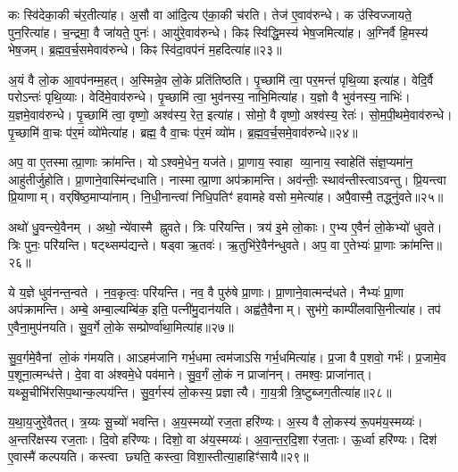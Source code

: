 कः स्वि॑देका॒की च॑र॒तीत्या॑ह।
अ॒सौ वा आ॑दि॒त्य ए॑का॒की च॑रति।
तेज॑ ए॒वाव॑रुन्धे।
क उ॑स्विज्जायते॒ पुन॒रित्या॑ह।
च॒न्द्रमा॒ वै जा॑यते॒ पुनः॑।
आयु॑रे॒वाव॑रुन्धे।
किꣴ स्वि॑द्धि॒मस्य॑ भेष॒जमित्या॑ह।
अ॒ग्निर्वै हि॒मस्य॑ भेष॒जम्।
ब्र॒ह्म॒व॒र्च॒समेवाव॑रुन्धे।
किꣴ स्वि॑दा॒वप॑नं म॒हदित्या॑ह॥२३॥

अ॒यं वै लो॒क आ॒वप॑नम्म॒हत्।
अ॒स्मिन्ने॒व लो॒के प्रति॑तिष्ठति।
पृ॒च्छामि॑ त्वा॒ पर॒मन्तं॑ पृथि॒व्या इत्या॑ह।
वेदि॒र्वै परो\-ऽन्तः॑ पृथि॒व्याः।
वेदि॑मे॒वाव॑रुन्धे।
पृ॒च्छामि॑ त्वा॒ भुव॑नस्य॒ नाभि॒मित्या॑ह।
य॒ज्ञो वै भुव॑नस्य॒ नाभिः॑।
य॒ज्ञमे॒वाव॑रुन्धे।
पृ॒च्छामि॑ त्वा॒ वृष्णो॒ अश्व॑स्य॒ रेत॒ इत्या॑ह।
सोमो॒ वै वृष्णो॒ अश्व॑स्य॒ रेतः॑।
सो॒म॒पी॒थमे॒वाव॑रुन्धे।
पृ॒च्छामि॑ वा॒चः प॑र॒मं व्यो॑मेत्या॑ह।
ब्रह्म॒ वै वा॒चः प॑र॒मं व्यो॑म।
ब्र॒ह्म॒व॒र्च॒समे॒वाव॑रुन्धे॥२४॥\anuvakamend[होता॑ भवति॒ वै वृष्टिः॑ पू॒र्वचि॑त्तिर॒न्नाद्य॑मे॒वाव॑रुन्धे म॒हदित्या॑ह॒ सोमो॒ वै वृष्णो॒ अश्व॑स्य॒ रेत॑श्च॒त्वारि॑ च]

अप॒ वा ए॒तस्मात्प्रा॒णाः क्रा॑मन्ति।
योऽश्वमे॒धेन॒ यज॑ते।
प्रा॒णाय॒ स्वाहा व्या॒नाय॒ स्वाहेति॑ संज्ञ॒प्यमा॑न॒ आहु॑तीर्जुहोति।
प्रा॒णाने॒वास्मि॑न्दधाति।
नास्मात्प्रा॒णा अप॑क्रामन्ति।
अव॑न्तीः॒ स्थाव॑न्तीस्त्वा\-ऽवन्तु।
प्रि॒यन्त्वा प्रि॒याणाम्।
वर्‌\mbox{}षि॑ष्ठ॒माप्या॑नाम्।
नि॒धी॒नान्त्वा॑ निधि॒पतिꣳ॑ हवामहे वसो म॒मेत्या॑ह।
अपै॒वास्मै॒ तद्ध्नु॑वते॥२५॥

अथो॑ धु॒वन्त्ये॒वैनम्।
अथो॒ न्ये॑वास्मै ह्नुवते।
त्रिः परि॑यन्ति।
त्रय॑ इ॒मे लो॒काः।
ए॒भ्य ए॒वैनं॑ लो॒केभ्यो॑ धुवते।
त्रिः पुनः॒ परि॑यन्ति।
षट्थ्सम्प॑द्यन्ते।
षड्वा ऋ॒तवः॑।
ऋ॒तुभि॑रे॒वैन॑न्धुवते।
अप॒ वा ए॒तेभ्यः॑ प्रा॒णाः क्रा॑मन्ति॥२६॥

ये य॒ज्ञे धुव॑नन्त॒न्वते।
न॒व॒कृत्वः॒ परि॑यन्ति।
नव॒ वै पुरु॑षे प्रा॒णाः।
प्रा॒णाने॒वात्मन्द॑धते।
नैभ्यः॑ प्रा॒णा अप॑क्रामन्ति।
अम्बे॒ अम्बा॒ल्यम्बि॑क॒ इति॒ पत्नी॑मु॒दान॑यति।
अह्व॑तै॒वैनाम्।
सुभ॑गे॒ काम्पी॑लवासि॒नीत्या॑ह।
तप॑ ए॒वैना॒मुप॑नयति।
सु॒व॒र्गे लो॒के सम्प्रोर्ण्वा॑था॒मित्या॑ह॥२७॥

सु॒व॒र्गमे॒वैनां लो॒कं ग॑मयति।
आऽहम॑जानि गर्भ॒धमा त्वम॑जाऽसि गर्भ॒धमित्या॑ह।
प्र॒जा वै प॒शवो॒ गर्भः॑।
प्र॒जामे॒व प॒शूना॒त्मन्ध॑त्ते।
दे॒वा वा अ॑श्वमे॒धे पव॑माने।
सु॒व॒र्गं लो॒कं न प्राजा॑नन्।
तमश्वः॒ प्राजा॑नात्।
यथ्सू॒चीभि॑रसिप॒थान्क॒ल्पय॑न्ति।
सु॒व॒र्गस्य॑ लो॒कस्य॒ प्रज्ञात्यै।
गा॒य॒त्री त्रि॒ष्टुब्जग॒तीत्या॑ह॥२८॥

य॒था॒य॒जुरे॒वैतत्।
त्र॒य्यः सू॒च्यो॑ भवन्ति।
अ॒य॒स्मय्यो॑ रज॒ता हरि॑ण्यः।
अ॒स्य वै लो॒कस्य॑ रू॒पम॑य॒स्मय्यः॑।
अ॒न्तरि॑क्षस्य रज॒ताः।
दि॒वो हरि॑ण्यः।
दिशो॒ वा अ॑य॒स्मय्यः॑।
अ॒वा॒न्त॒र॒दि॒शा र॑ज॒ताः।
ऊ॒र्ध्वा हरि॑ण्यः।
दिश॑ ए॒वास्मै॑ कल्पयति।
कस्त्वा छ्यति॒ कस्त्वा॒ विशा॒स्तीत्या॒हाहिꣳ॑सायै॥२९॥\anuvakamend[ह्नु॒व॒ते॒ क्रा॒म॒न्त्यू॒र्ण्वा॒था॒मित्या॑ह॒ जग॒तीत्या॑ह कल्पय॒त्येकं॑ च]

